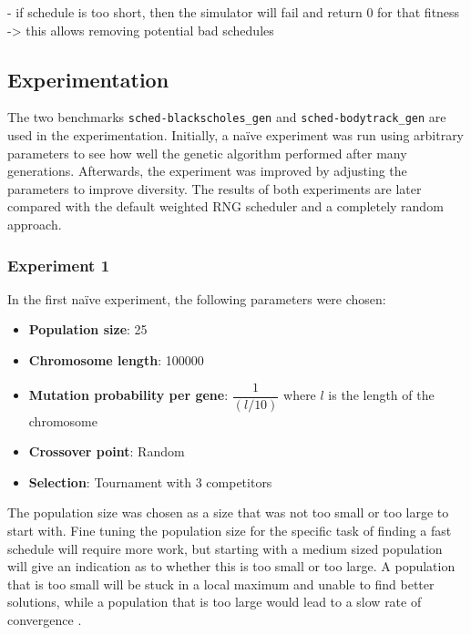 \documentclass{article}
\newcommand{\n}[0]{\\[\baselineskip]}
\begin{document}
- if schedule is too short, then the simulator will fail and return 0 for that fitness -> this allows removing potential bad schedules

\subsection{Experimentation}
The two benchmarks \texttt{sched-blackscholes_gen} and \texttt{sched-bodytrack_gen} are used in the experimentation. Initially, a na\"{i}ve experiment was run using arbitrary parameters to see how well the genetic algorithm performed after many generations. Afterwards, the experiment was improved by adjusting the parameters to improve diversity. The results of both experiments are later compared with the default weighted RNG scheduler and a completely random approach. 
\n

\subsubsection{Experiment 1}
In the first na\"{i}ve experiment, the following parameters were chosen:
\begin{itemize}
\item \textbf{Population size}: 25
\item \textbf{Chromosome length}: 100000
\item \textbf{Mutation probability per gene}: $\dfrac{1}{(l/10)}$ where $l$ is the length of the chromosome
\item \textbf{Crossover point}: Random
\item \textbf{Selection}: Tournament with 3 competitors
\end{itemize}
The population size was chosen as a size that was not too small or too large to start with. Fine tuning the population size for the specific task of finding a fast schedule will require more work, but starting with a medium sized population will give an indication as to whether this is too small or too large. A population that is too small will be stuck in a local maximum and unable to find better solutions, while a population that is too large would lead to a slow rate of convergence \cite{ga-size}.
\end{document}
